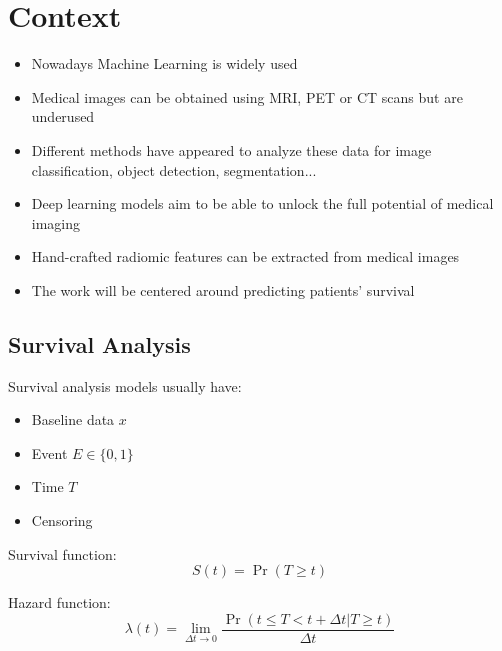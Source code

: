 
\section{Context}
\begin{frame}{\insertsec}
	\begin{itemize}
    \item Nowadays Machine Learning is widely used
    \item Medical images can be obtained using MRI, PET or CT scans but are underused
    \item Different methods have appeared to analyze these data for image classification,
    object detection, segmentation...
    \item Deep learning models aim to be able to unlock the full potential of medical imaging
    \item Hand-crafted radiomic features can be extracted from medical images
    \item The work will be centered around predicting patients' survival
  \end{itemize}
\end{frame}

\subsection{Survival Analysis}
\begin{frame}{\insertsubsec}
  Survival analysis models usually have:
  \begin{itemize}
    \item Baseline data \( x \)
    \item Event \( E \in \{0, 1\} \)
    \item Time \( T \)
    \item Censoring
  \end{itemize}
  
  Survival function:
  \[
    S(t) = \Pr(T \ge t)
  \]

  Hazard function:
  \[
    \lambda(t) = \lim_{\Delta t \rightarrow 0}
    \frac{\Pr(t \le T < t + \Delta t | T \ge t)}{\Delta t}
  \]
\end{frame}

